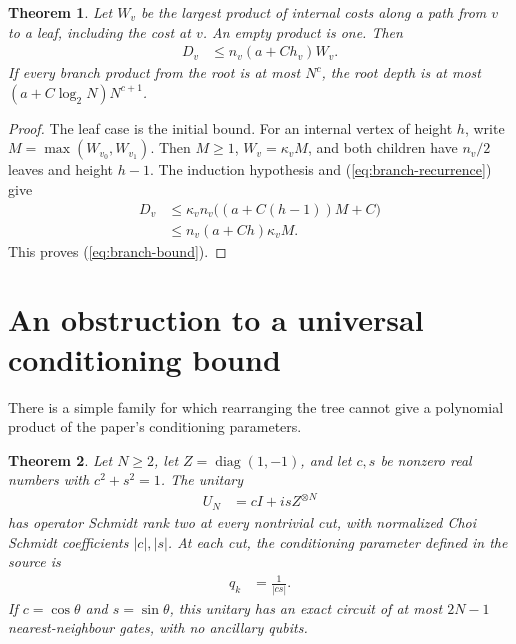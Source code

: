 \documentclass[11pt]{article}
\newtheorem{theorem}{Theorem}
\begin{document}
\begin{theorem}\label{thm:branches}
Let $W_v$ be the largest product of internal costs along a path from $v$
to a leaf, including the cost at $v$. An empty product is one. Then
\begin{align}
 D_v&\leq n_v(a+Ch_v)W_v.
 \label{eq:branch-bound}
\end{align}
If every branch product from the root is at most $N^c$, the root depth is
at most $(a+C\log_2N)N^{c+1}$.
\end{theorem}

\begin{proof}
The leaf case is the initial bound. For an internal vertex of height $h$,
write $M=\max(W_{v_0},W_{v_1})$. Then $M\geq1$,
$W_v=\kappa_vM$, and both children have $n_v/2$ leaves and height $h-1$.
The induction hypothesis and (\ref{eq:branch-recurrence}) give
\begin{align}
 D_v
 &\leq \kappa_v n_v\bigl((a+C(h-1))M+C\bigr)\\
 &\leq n_v(a+Ch)\kappa_vM.
\end{align}
This proves (\ref{eq:branch-bound}).
\end{proof}

\section{An obstruction to a universal conditioning bound}

There is a simple family for which rearranging the tree cannot give a
polynomial product of the paper's conditioning parameters.

\begin{theorem}\label{thm:parity}
Let $N\geq2$, let $Z=\operatorname{diag}(1,-1)$, and let $c,s$ be nonzero real
numbers with $c^2+s^2=1$. The unitary
\begin{align}
 U_N&=cI+i s Z^{\otimes N}
 \label{eq:parity-unitary}
\end{align}
has operator Schmidt rank two at every nontrivial cut, with normalized
Choi Schmidt coefficients $|c|,|s|$. At each cut, the conditioning parameter
defined in the source is
\begin{align}
 q_k&=\frac{1}{|cs|}.
 \label{eq:parity-conditioning}
\end{align}
If $c=\cos\theta$ and $s=\sin\theta$, this unitary has an exact circuit of
at most $2N-1$ nearest-neighbour gates, with no ancillary qubits.
\end{theorem}
\end{document}
